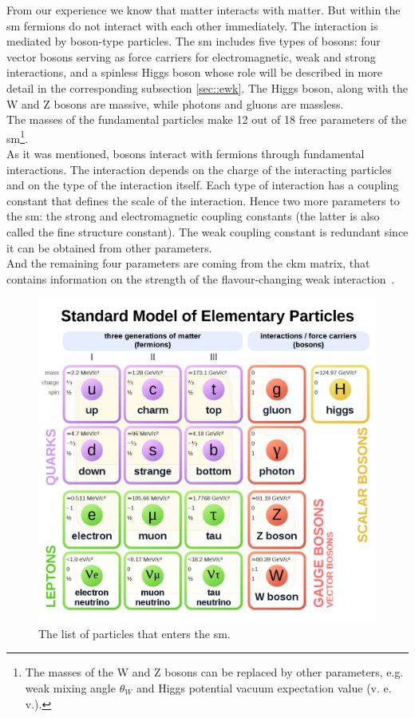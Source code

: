	From our experience we know that matter interacts with matter. But within the \gls{sm} fermions do not interact with each other immediately. The interaction is mediated by boson-type particles. The \gls{sm} includes five types of bosons: four vector bosons serving as force carriers for electromagnetic, weak and strong interactions, and a spinless Higgs boson whose role will be described in more detail in the corresponding subsection \ref{sec::ewk}. The Higgs boson, along with the W and Z bosons are massive, while photons and gluons are massless.\\
	The masses of the fundamental particles make 12 out of 18 free parameters of the \gls{sm}\footnote{The masses of the W and Z bosons can be replaced by other parameters, e.g. weak mixing angle $\theta_W$ and Higgs potential vacuum expectation value (v. e. v.).}. \\
	As it was mentioned, bosons interact with fermions through fundamental interactions. The interaction depends on the charge of the interacting particles and on the type of the interaction itself. Each type of interaction has a coupling constant that defines the scale of the interaction. Hence two more parameters to the \gls{sm}: the strong and electromagnetic coupling constants (the latter is also called the fine structure constant). The weak coupling constant is redundant since it can be obtained from other parameters.\\
	And the remaining four parameters are coming from the \gls{ckm} matrix, that contains information on the strength of the flavour-changing weak interaction~\cite{PhysRevD.86.010001}. 
	
	 \begin{figure}[htpb]
		\includegraphics[width=\textwidth,keepaspectratio]{SMwiki.png}
		\caption{The list of particles that enters the \gls{sm}\cite{sm_wiki}. }
		\label{fig::SMwiki}
	\end{figure}
		
